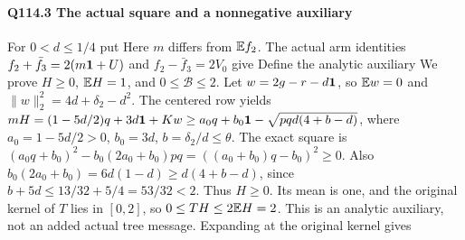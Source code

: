 \paragraph{Q114.3 The actual square and a nonnegative auxiliary}\label{part:Q114.3}
For $0<\allowbreak d\le\allowbreak 1/4$ put
Here $m$ differs from $\mathbb E f_2$.
The actual arm identities $f_2+\bar f_3=\allowbreak 2(m\mathbf1+U)$ and
$f_2-\bar f_3=\allowbreak 2V_0$ give
Define the analytic auxiliary
We prove $H\ge\allowbreak 0$, $\mathbb E H=\allowbreak 1$, and $0\le\allowbreak \mathcal B\le\allowbreak 2$.
Let $w=\allowbreak 2g-r-d\mathbf1$, so $\mathbb E w=\allowbreak 0$ and
$\|w\|_2^2=\allowbreak 4d+\delta_2-d^2$.
The centered row yields
$mH=(1-5d/2)q+3d\mathbf1+Kw
\ge a_0q+b_0\mathbf1-\sqrt{pqd(4+b-d)}$,
where $a_0=\allowbreak 1-5d/2>\allowbreak 0$, $b_0=\allowbreak 3d$, $b=\allowbreak \delta_2/d\le\allowbreak \theta$.
The exact square is
$(a_0q+b_0)^2-b_0(2a_0+b_0)pq=\allowbreak ((a_0+b_0)q-b_0)^2\ge\allowbreak 0$.
Also $b_0(2a_0+b_0)=\allowbreak 6d(1-d)\ge\allowbreak  d(4+b-d)$, since
$b+5d\le\allowbreak 13/32+5/4=\allowbreak 53/32<\allowbreak 2$.
Thus $H\ge\allowbreak 0$. Its mean is one, and the original kernel of $T$ lies
in $[0,\allowbreak 2]$, so $0\le\allowbreak  TH\le\allowbreak 2\mathbb E H=\allowbreak 2$.
This is an analytic auxiliary, not an added actual tree message.
Expanding at the original kernel gives

